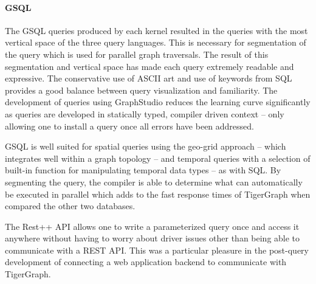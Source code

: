 \paragraph{GSQL} 

The GSQL queries produced by each kernel resulted in the queries with the most vertical space of the three query languages. This is necessary for segmentation of the query which is used for parallel graph traversals. The result of this segmentation and vertical space has made each query extremely readable and expressive. The conservative use of ASCII art and use of keywords from SQL provides a good balance between query visualization and familiarity. The development of queries using GraphStudio reduces the learning curve significantly as queries are developed in statically typed, compiler driven context -- only allowing one to install a query once all errors have been addressed. 

GSQL is well suited for spatial queries using the geo-grid approach -- which integrates well within a graph topology -- and temporal queries with a selection of built-in function for manipulating temporal data types -- as with SQL. By segmenting the query, the compiler is able to determine what can automatically be executed in parallel which adds to the fast response times of TigerGraph when compared the other two databases.

The Rest++ API allows one to write a parameterized query once and access it anywhere without having to worry about driver issues other than being able to communicate with a REST API. This was a particular pleasure in the post-query development of connecting a web application backend to communicate with TigerGraph.
